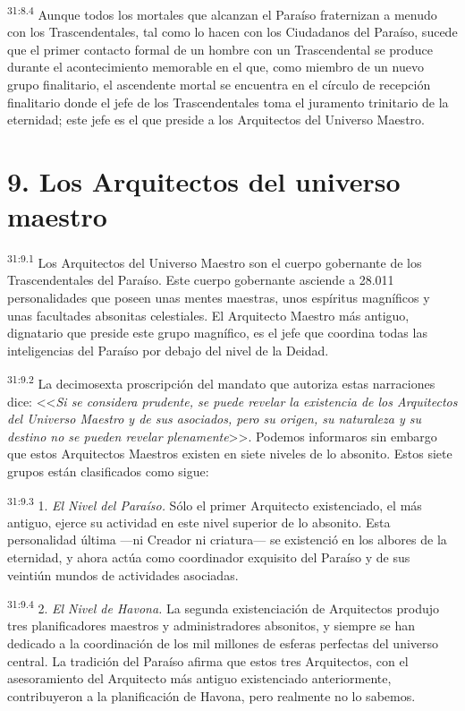 \par
\textsuperscript{31:8.4} Aunque todos los mortales que alcanzan el Paraíso fraternizan a menudo con los Trascendentales, tal como lo hacen con los Ciudadanos del Paraíso, sucede que el primer contacto formal de un hombre con un Trascendental se produce durante el acontecimiento memorable en el que, como miembro de un nuevo grupo finalitario, el ascendente mortal se encuentra en el círculo de recepción finalitario donde el jefe de los Trascendentales toma el juramento trinitario de la eternidad; este jefe es el que preside a los Arquitectos del Universo Maestro.

\section*{9. Los Arquitectos del universo maestro}
\par
\textsuperscript{31:9.1} Los Arquitectos del Universo Maestro son el cuerpo gobernante de los Trascendentales del Paraíso. Este cuerpo gobernante asciende a 28.011 personalidades que poseen unas mentes maestras, unos espíritus magníficos y unas facultades absonitas celestiales. El Arquitecto Maestro más antiguo, dignatario que preside este grupo magnífico, es el jefe que coordina todas las inteligencias del Paraíso por debajo del nivel de la Deidad.

\par
\textsuperscript{31:9.2} La decimosexta proscripción del mandato que autoriza estas narraciones dice: <<\textit{Si se considera prudente, se puede revelar la existencia de los Arquitectos del Universo Maestro y de sus asociados, pero su origen, su naturaleza y su destino no se pueden revelar plenamente}>>. Podemos informaros sin embargo que estos Arquitectos Maestros existen en siete niveles de lo absonito. Estos siete grupos están clasificados como sigue:

\par
\textsuperscript{31:9.3} 1. \textit{El Nivel del Paraíso.} Sólo el primer Arquitecto existenciado, el más antiguo, ejerce su actividad en este nivel superior de lo absonito. Esta personalidad última ---ni Creador ni criatura--- se existenció en los albores de la eternidad, y ahora actúa como coordinador exquisito del Paraíso y de sus veintiún mundos de actividades asociadas.

\par
\textsuperscript{31:9.4} 2. \textit{El Nivel de Havona.} La segunda existenciación de Arquitectos produjo tres planificadores maestros y administradores absonitos, y siempre se han dedicado a la coordinación de los mil millones de esferas perfectas del universo central. La tradición del Paraíso afirma que estos tres Arquitectos, con el asesoramiento del Arquitecto más antiguo existenciado anteriormente, contribuyeron a la planificación de Havona, pero realmente no lo sabemos.

